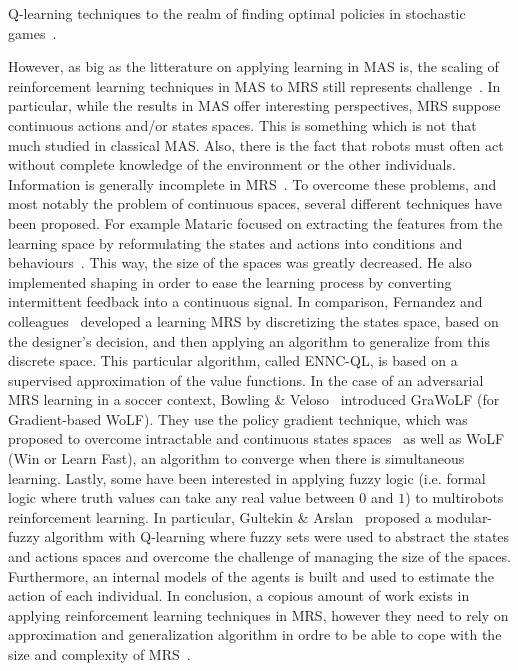 Q-learning techniques to the realm of finding optimal policies in stochastic games~\cite{Littman1994, Claus1998, Bowling2003, Greenwald2005, Kapetanakis2005}.

    However, as big as the litterature on applying learning in MAS is, the scaling of reinforcement learning techniques in MAS to MRS still represents challenge~\cite{Yang2005}. In particular, while the results in MAS offer interesting perspectives, MRS suppose continuous actions and/or states spaces. This is something which is not that much studied in classical MAS. Also, there is the fact that robots must often act without complete knowledge of the environment or the other individuals. Information is generally incomplete in MRS~\cite{Yang2005, Fernandez2005}. To overcome these problems, and most notably the problem of continuous spaces, several different techniques have been proposed. For example Mataric focused on extracting the features from the learning space by reformulating the states and actions into conditions and behaviours~\cite{Mataric1997}. This way, the size of the spaces was greatly decreased. He also implemented shaping in order to ease the learning process by converting intermittent feedback into a continuous signal. In comparison, Fernandez and colleagues~\cite{Fernandez2005} developed a learning MRS by discretizing the states space, based on the designer's decision, and then applying an algorithm to generalize from this discrete space. This particular algorithm, called ENNC-QL, is based on a supervised approximation of the value functions. In the case of an adversarial MRS learning in a soccer context, Bowling & Veloso~\cite{Bowling2003} introduced GraWoLF (for Gradient-based WoLF). They use the policy gradient technique, which was proposed to overcome intractable and continuous states spaces~\cite{Sutton2000} as well as WoLF (Win or Learn Fast), an algorithm to converge when there is simultaneous learning. Lastly, some have been interested in applying fuzzy logic (i.e. formal logic where truth values can take any real value between $0$ and $1$) to multirobots reinforcement learning. In particular, Gultekin & Arslan~\cite{Gultekin2002} proposed a modular-fuzzy algorithm with Q-learning where fuzzy sets were used to abstract the states and actions spaces and overcome the challenge of managing the size of the spaces. Furthermore, an internal models of the agents is built and used to estimate the action of each individual. In conclusion, a copious amount of work exists in applying reinforcement learning techniques in MRS, however they need to rely on approximation and generalization algorithm in ordre to be able to cope with the size and complexity of MRS~\cite{Yang2005, Parker2008}.

